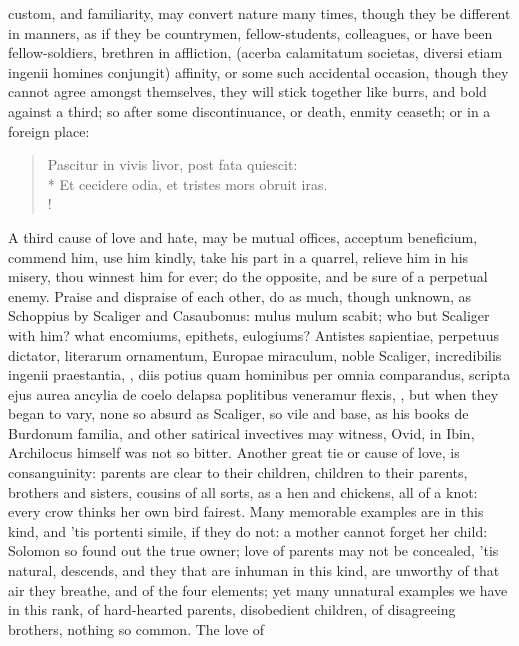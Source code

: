 {custom, and familiarity, may convert nature many times, though they be
different in manners, as if they be countrymen, fellow-students,
colleagues, or have been fellow-soldiers, brethren in affliction,
(acerba calamitatum societas, diversi etiam ingenii homines
conjungit) affinity, or some such accidental occasion, though they
cannot agree amongst themselves, they will stick together like burrs,
and bold against a third; so after some discontinuance, or death,
enmity ceaseth; or in a foreign place:
%
\begin{latin}
\begin{verse}
Pascitur in vivis livor, post fata quiescit:\\*
Et cecidere odia, et tristes mors obruit iras.\\!
\end{verse}
\end{latin}
%
A third cause of love and hate, may be mutual offices, acceptum
beneficium, commend him, use him kindly, take his part in a
quarrel, relieve him in his misery, thou winnest him for ever; do the
opposite, and be sure of a perpetual enemy. Praise and dispraise of
each other, do as much, though unknown, as Schoppius by Scaliger
and Casaubonus: mulus mulum scabit; who but Scaliger with him? what
encomiums, epithets, eulogiums? Antistes sapientiae, perpetuus
dictator, literarum ornamentum, Europae miraculum, noble Scaliger,
 incredibilis ingenii praestantia, \etc{}, diis potius quam
hominibus per omnia comparandus, scripta ejus aurea ancylia de coelo
delapsa poplitibus veneramur flexis, \etc{}, but when they began to
vary, none so absurd as Scaliger, so vile and base, as his books de
Burdonum familia, and other satirical invectives may witness, Ovid, in
Ibin, Archilocus himself was not so bitter. Another great tie or cause
of love, is consanguinity: parents are clear to their children,
children to their parents, brothers and sisters, cousins of all sorts,
as a hen and chickens, all of a knot: every crow thinks her own bird
fairest. Many memorable examples are in this kind, and 'tis portenti
simile, if they do not: a mother cannot forget her child: Solomon
so found out the true owner; love of parents may not be concealed, 'tis
natural, descends, and they that are inhuman in this kind, are unworthy
of that air they breathe, and of the four elements; yet many unnatural
examples we have in this rank, of hard-hearted parents, disobedient
children, of disagreeing brothers, nothing so common. The love of
}

